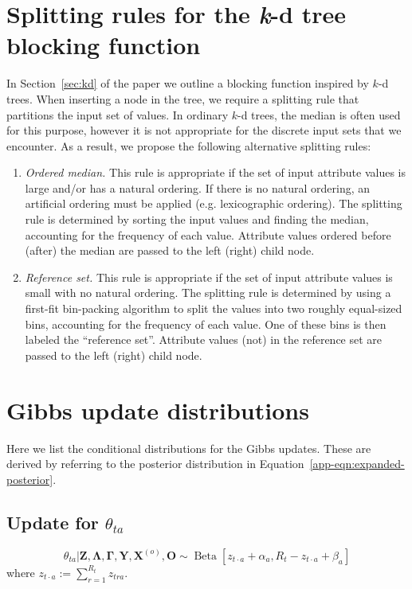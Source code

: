 \documentclass[12pt,letterpaper]{article}
\renewcommand\vec{\bm}
\newcommand{\1}[1]{\mathbb{I}\!\left[#1\right]} %
\begin{document}
\section{Splitting rules for the \textit{k}-d tree blocking function}
\label{app-sec:splitting-rules}
In Section~\ref{sec:kd} of the paper we outline a blocking function inspired 
by $k$-d trees.
When inserting a node in the tree, we require a splitting rule that partitions 
the input set of values.
In ordinary $k$-d trees, the median is often used for this purpose, 
however it is not appropriate for the discrete input sets that we 
encounter.
As a result, we propose the following alternative splitting rules:
\begin{enumerate}
  \item \emph{Ordered median.}
  This rule is appropriate if the set of input attribute 
  values is large and\slash or has a natural ordering.
  If there is no natural ordering, an artificial ordering 
  must be applied (e.g. lexicographic ordering).
  The splitting rule is determined by sorting the input 
  values and finding the median, accounting for the 
  frequency of each value.
  Attribute values ordered before (after) the median are 
  passed to the left (right) child node.
  \item \emph{Reference set.}
  This rule is appropriate if the set of input attribute 
  values is small with no natural ordering.
  The splitting rule is determined by using a first-fit 
  bin-packing algorithm to split the values into two roughly 
  equal-sized bins, accounting for the frequency of each value.
  One of these bins is then labeled the ``reference set''.
  Attribute values (not) in the reference set are passed to 
  the left (right) child node.
\end{enumerate}

\section{Gibbs update distributions}
\label{app-sec:gibbs}
Here we list the conditional distributions for the Gibbs updates.
These are derived by referring to the posterior distribution in 
Equation~\ref{app-eqn:expanded-posterior}.

\subsection{Update for \texorpdfstring{$\theta_{ta}$}{distortion probabilities}}
\begin{equation}
\theta_{ta}|\vec{Z}, \vec{\Lambda}, \vec{\Gamma}, \vec{Y}, \vec{X}^{(o)}, \vec{O} \sim \operatorname{Beta}[z_{t \cdot a} + \alpha_{a}, R_t - z_{t \cdot a} + \beta_{a}]
\label{app-eqn:theta-update}
\end{equation}
where $z_{t \cdot a} := \sum_{r = 1}^{R_t} z_{tra}$.
\end{document}
